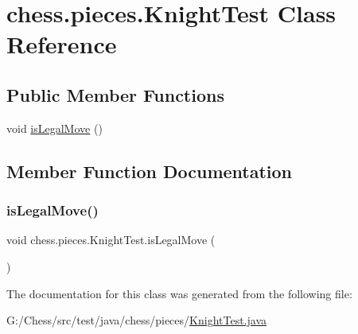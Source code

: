 \hypertarget{classchess_1_1pieces_1_1_knight_test}{}\section{chess.\+pieces.\+Knight\+Test Class Reference}
\label{classchess_1_1pieces_1_1_knight_test}
\subsection*{Public Member Functions}
\begin{DoxyCompactItemize}
\item 
void \mbox{\hyperlink{classchess_1_1pieces_1_1_knight_test_af53ddfeef1fd1857d95b1150dad5b49d}{is\+Legal\+Move}} ()
\end{DoxyCompactItemize}


\subsection{Member Function Documentation}
\mbox{\label{classchess_1_1pieces_1_1_knight_test_af53ddfeef1fd1857d95b1150dad5b49d}} 
\subsubsection{\texorpdfstring{is\+Legal\+Move()}{isLegalMove()}}
{\footnotesize\ttfamily void chess.\+pieces.\+Knight\+Test.\+is\+Legal\+Move (\begin{DoxyParamCaption}{ }\end{DoxyParamCaption})}



The documentation for this class was generated from the following file\+:\begin{DoxyCompactItemize}
\item 
G\+:/\+Chess/src/test/java/chess/pieces/\mbox{\hyperlink{_knight_test_8java}{Knight\+Test.\+java}}\end{DoxyCompactItemize}
